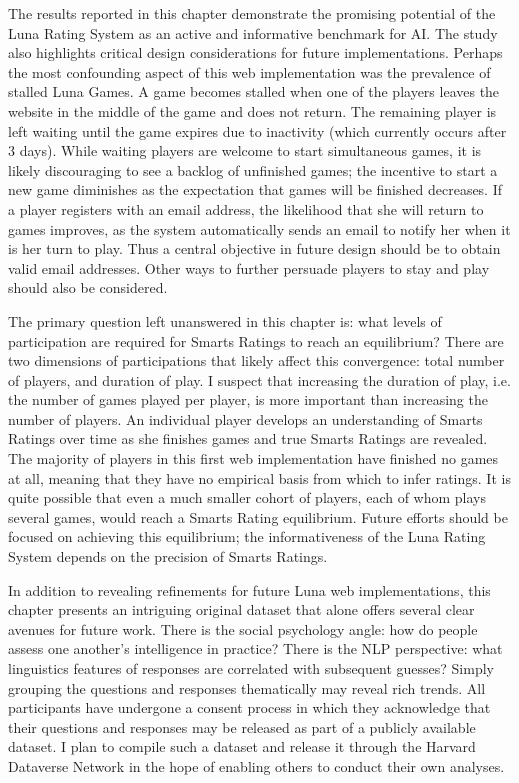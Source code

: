 The results reported in this chapter demonstrate the promising potential of the Luna Rating System as an active and informative benchmark for AI. The study also highlights critical design considerations for future implementations. Perhaps the most confounding aspect of this web implementation was the prevalence of stalled Luna Games. A game becomes stalled when one of the players leaves the website in the middle of the game and does not return. The remaining player is left waiting until the game expires due to inactivity (which currently occurs after 3 days). While waiting players are welcome to start simultaneous games, it is likely discouraging to see a backlog of unfinished games; the incentive to start a new game diminishes as the expectation that games will be finished decreases. If a player registers with an email address, the likelihood that she will return to games improves, as the system automatically sends an email to notify her when it is her turn to play. Thus a central objective in future design should be to obtain valid email addresses. Other ways to further persuade players to stay and play should also be considered.

The primary question left unanswered in this chapter is: what levels of participation are required for Smarts Ratings to reach an equilibrium? There are two dimensions of participations that likely affect this convergence: total number of players, and duration of play. I suspect that increasing the duration of play, i.e. the number of games played per player, is more important than increasing the number of players. An individual player develops an understanding of Smarts Ratings over time as she finishes games and true Smarts Ratings are revealed. The majority of players in this first web implementation have finished no games at all, meaning that they have no empirical basis from which to infer ratings. It is quite possible that even a much smaller cohort of players, each of whom plays several games, would reach a Smarts Rating equilibrium. Future efforts should be focused on achieving this equilibrium; the informativeness of the Luna Rating System depends on the precision of Smarts Ratings.

In addition to revealing refinements for future Luna web implementations, this chapter presents an intriguing original dataset that alone offers several clear avenues for future work. There is the social psychology angle: how do people assess one another's intelligence in practice? There is the NLP perspective: what linguistics features of responses are correlated with subsequent guesses? Simply grouping the questions and responses thematically may reveal rich trends. All participants have undergone a consent process in which they acknowledge that their questions and responses may be released as part of a publicly available dataset. I plan to compile such a dataset and release it through the Harvard Dataverse Network in the hope of enabling others to conduct their own analyses.
